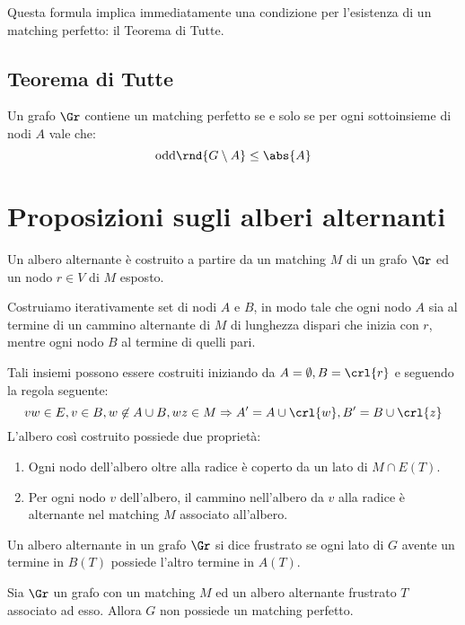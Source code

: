 \documentclass[\main/main.tex]{subfiles}
\begin{document}
Questa formula implica immediatamente una condizione per l'esistenza di un matching perfetto: il Teorema di Tutte.

\subsection{Teorema di Tutte}
\begin{theorem}
  Un grafo \(\Gr \) contiene un matching perfetto se e solo se per ogni sottoinsieme di nodi \(A\) vale che:
  \[
    \text{odd}\rnd{G\setminus A} \leq \abs{A}
  \]
\end{theorem}
\clearpage
\section{Proposizioni sugli alberi alternanti}
\begin{definition}
  Un albero alternante è costruito a partire da un matching \(M\) di un grafo \(\Gr \) ed un nodo \(r \in V\) di \(M\) esposto.

  Costruiamo iterativamente set di nodi \(A\) e \(B\), in modo tale che ogni nodo \(A\) sia al termine di un cammino alternante di \(M\) di lunghezza dispari che inizia con \(r\), mentre ogni nodo \(B\) al termine di quelli pari.

  Tali insiemi possono essere costruiti iniziando da \(A=\emptyset, B=\crl{r}\) e seguendo la regola seguente:
  \[
    vw \in E, v \in B, w \not\in A \cup B, wz \in M \Rightarrow A' = A \cup \crl{w}, B' = B \cup \crl{z}
  \]
  L'albero così costruito possiede due proprietà:
  \begin{enumerate}
    \item Ogni nodo dell'albero oltre alla radice è coperto da un lato di \(M \cap E(T)\).
    \item Per ogni nodo \(v\) dell'albero, il cammino nell'albero da \(v\) alla radice è alternante nel matching \(M\) associato all'albero.
  \end{enumerate}
\end{definition}
\begin{definition}
  Un albero alternante in un grafo \(\Gr \) si dice frustrato se ogni lato di \(G\) avente un termine in \(B(T)\) possiede l'altro termine in \(A(T)\).
\end{definition}
\begin{proposition}
  Sia \(\Gr \) un grafo con un matching \(M\) ed un albero alternante frustrato \(T\) associato ad esso. Allora \(G\) non possiede un matching perfetto.
\end{proposition}
\end{document}
